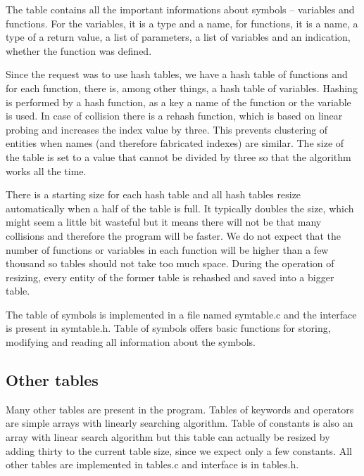 \documentclass[10pt,a4paper,titlepage]{article}
\begin{document}
\begin{justify}

The table contains all the important informations about symbols – variables and
functions. For the variables, it is a type and a name, for functions, it is a name,
a type of a return value, a list of parameters, a list of variables and an
indication, whether the function was defined.

Since the request was to use hash tables, we have a hash table of
functions and for each function, there is, among other things, a hash table of
variables. Hashing is performed by a hash function, as a key a name of the
function or the variable is used. In case of collision there is a rehash
function, which is based on linear probing and increases the index value
by three. This prevents clustering of entities when names (and therefore
fabricated indexes) are similar. The size of the table is set to a value
that cannot be divided by three so that the algorithm works all the time.

There is a starting size for each hash table and all hash tables resize
automatically when a half of the table is full. It typically doubles the size,
which might seem a little bit wasteful but it means there will not be that many
collisions and therefore the program will be faster. We do not expect that the
number of functions or variables in each function will be higher than a few
thousand so tables should not take too much space. During the operation of
resizing, every entity of the former table is rehashed and saved into a bigger
table.

The table of symbols is implemented in a file named symtable.c and the
interface is present in symtable.h. Table of symbols offers basic functions
for storing, modifying and reading all information about the symbols.

\end{justify}

\subsection{Other tables}

\begin{justify}

Many other tables are present in the program. Tables of keywords and operators
are simple arrays with linearly searching algorithm. Table of constants is
also an array with linear search algorithm but this table can actually
be resized by adding thirty to the current table size, since we expect only a
few constants. All other tables are implemented in tables.c and interface
is in tables.h.

\end{justify}
\end{document}
